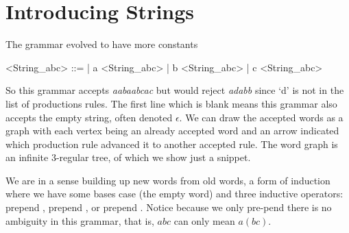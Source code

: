 
\section{Introducing Strings}
The grammar evolved
to have more constants 
\begin{center}
\begin{Gcode}[]
<String_abc> ::=  
               | a <String_abc> 
               | b <String_abc>
               | c <String_abc> 
\end{Gcode}
\end{center}
So this grammar accepts \emph{aabaabcac} 
but would reject \emph{adabb} since `d' is not in the list of productions 
rules.  The first line which is blank means this grammar also accepts the 
empty string, often denoted 
$\epsilon$.  We can draw the accepted words as a graph with each vertex 
being an already accepted word and an arrow indicated which production rule 
advanced it to another accepted rule.  The word graph is an infinite 
3-regular tree, of which we show just a snippet.
\begin{center}
\end{center}
We are in a sense building up new words from old words, 
a form of induction where we have some bases case (the empty word)
and three inductive operators: prepend , prepend , or 
prepend .
Notice because we only pre-pend there is no ambiguity 
in this grammar, that is, $abc$ can only mean $a(bc)$.

